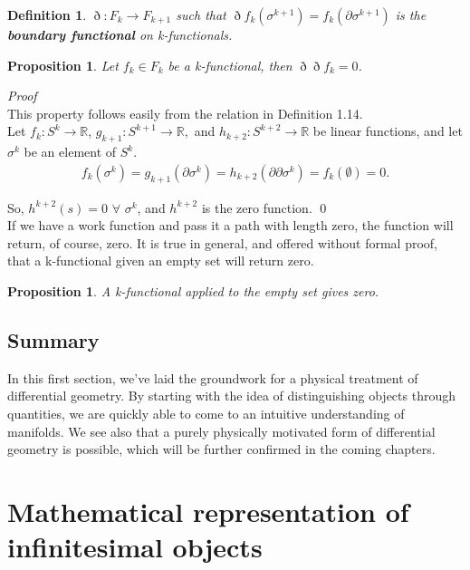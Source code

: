 \documentclass{book}
\newtheorem{defn}[equation]{Definition}
\newtheorem{prop}[equation]{Proposition}
\renewenvironment{proof}{\emph{Proof}}{\qed}
\begin{document}
\begin{defn}
	$\eth : F_k \to F_{k+1}$ such that $\eth f_k(\sigma^{k+1}) = f_k(\partial \sigma^{k+1})$ is the \textbf{boundary functional} on k-functionals. 
\end{defn}

\begin{prop}
	Let $f_k \in F_k$ be a k-functional, then $\eth\eth f_k = 0 $.
	
\end{prop}
\begin{proof}\\
	This property follows easily from the relation in Definition 1.14.\\ 
	Let $f_k : S^k \to \mathbb{R}$, $g_{k+1} : S^{k+1} \to \mathbb{R},$ and $h_{k+2}: S^{k+2} \to \mathbb{R}$ be linear functions, and let $\sigma^k$ be an element of $S^k$. \begin{gather}f_k(\sigma^k) = g_{k+1}(\partial \sigma^k) = h_{k+2}(\partial\partial \sigma^k) = f_k(\emptyset) = 0.\end{gather} 
	
	So, $h^{k+2}(s) = 0$ $\forall$ $\sigma^k$, and $h^{k+2}$ is the zero function. 
\end{proof}\\

If we have a work function and pass it a path with length zero, the function will return, of course, zero. It is true in general, and offered without formal proof, that a k-functional given an empty set will return zero. 

\begin{prop}
	A k-functional applied to the empty set gives zero. 
\end{prop}





\section{Summary}


In this first section, we've laid the groundwork for a physical treatment of differential geometry. By starting with the idea of distinguishing objects through quantities, we are quickly able to come to an intuitive understanding of manifolds. We see also that a purely physically motivated form of differential geometry is possible, which will be further confirmed in the coming chapters. 


\chapter{Mathematical representation of infinitesimal objects}
\end{document}
